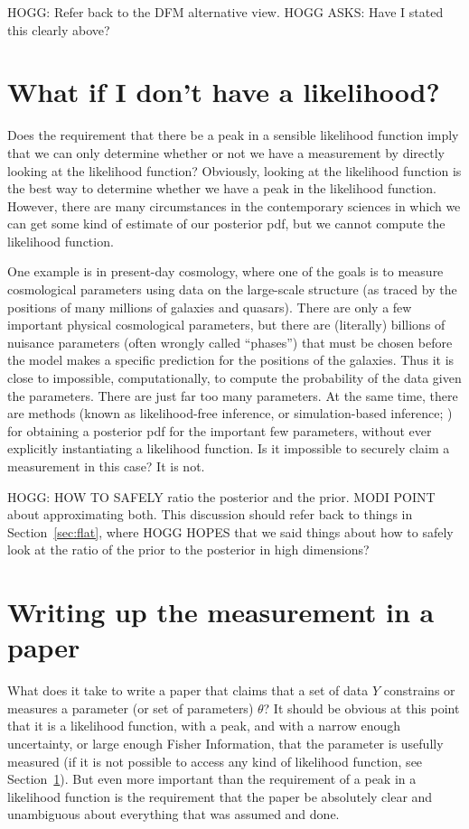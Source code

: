 \documentclass{article}
\newcommand{\sectionname}{Section}
\newcommand{\secref}[1]{\sectionname~\ref{#1}}
\begin{document}
HOGG: Refer back to the DFM alternative view. HOGG ASKS: Have I stated this clearly above?

\section{What if I don't have a likelihood?}\label{sec:lfi}
Does the requirement that there be a peak in a sensible likelihood function imply that we can only determine whether or not we have a measurement by directly looking at the likelihood function?
Obviously, looking at the likelihood function is the best way to determine whether we have a peak in the likelihood function.
However, there are many circumstances in the contemporary sciences in which we can get some kind of estimate of our posterior pdf, but we cannot compute the likelihood function.

One example is in present-day cosmology, where one of the goals is to measure cosmological parameters using data on the large-scale structure (as traced by the positions of many millions of galaxies and quasars).
There are only a few important physical cosmological parameters, but there are (literally) billions of nuisance parameters (often wrongly called ``phases'') that must be chosen before the model makes a specific prediction for the positions of the galaxies.
Thus it is close to impossible, computationally, to compute the probability of the data given the parameters.
There are just far too many parameters.
At the same time, there are methods (known as likelihood-free inference, or simulation-based inference; \cite{abc, sbi}) for obtaining a posterior pdf for the important few parameters, without ever explicitly instantiating a likelihood function.
Is it impossible to securely claim a measurement in this case?
It is not.

HOGG: HOW TO SAFELY ratio the posterior and the prior. MODI POINT about approximating both.
This discussion should refer back to things in \secref{sec:flat}, where HOGG HOPES that we said things about how to safely look at the ratio of the prior to the posterior in high dimensions?

\section{Writing up the measurement in a paper}\label{sec:claim}
What does it take to write a paper that claims that a set of data $Y$ constrains or measures a parameter (or set of parameters) $\theta$?
It should be obvious at this point that it is a likelihood function, with a peak, and with a narrow enough uncertainty, or large enough Fisher Information, that the parameter is usefully measured
(if it is not possible to access any kind of likelihood function, see \secref{sec:lfi}).
But even more important than the requirement of a peak in a likelihood function is the requirement that the paper be absolutely clear and unambiguous about everything that was assumed and done.
\end{document}
